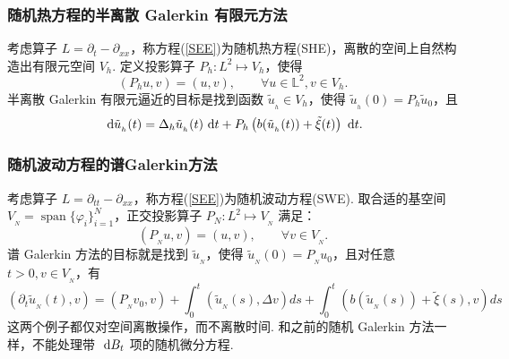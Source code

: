 \subsubsection*{随机热方程的半离散 Galerkin 有限元方法}

考虑算子 $L=\partial_t - \partial_{xx}$，称方程(\ref{SEE})为随机热方程(SHE)，离散的空间上自然构造出有限元空间 $V_h$. 定义投影算子 $P_h:L^2\mapsto V_h$，使得
\[
(P_h u,v) = (u,v),\qquad \forall u\in \mathbb L^2,v\in V_h.
\]
半离散 Galerkin 有限元逼近的目标是找到函数 $\tilde{u}_{_h} \in V_h$，使得 $\tilde u_{_h}(0) = P_h \tilde u_0$，且
\[
\text{ d} \tilde u_{_h}(t) = \Delta_h \tilde u_{_h}(t) \text{ d} t + 
P_h \left( b(\tilde u_{_h}(t))  + \tilde \xi (t)\right) \text{ d} t.
\]


\subsubsection*{随机波动方程的谱Galerkin方法}

考虑算子 $L=\partial_{tt} - \partial_{xx}$，称方程(\ref{SEE})为随机波动方程(SWE). 取合适的基空间 $V_{_N} = \operatorname{span}\{\varphi_i\}_{i=1}^N$，正交投影算子 $P_N:L^2\mapsto V_{_N}$ 满足：
\[
(P_{_N} u,v) = (u,v) ,\qquad \forall v \in V_{_N}. 
\]
谱 Galerkin 方法的目标就是找到 $\tilde{u}_{_N}$，使得 $\tilde{u}_{_N}(0) = P_{_N} u_0$，且对任意 $t>0,v\in V_{_N}$，有
\[
\left(\partial_{t} \tilde{u}_{_N}(t), v\right)=\left(P_{_N} v_{0}, v\right)+\int_{0}^{t}\left(\tilde{u}_{_N}(s), \Delta v\right) d s+\int_{0}^{t}\left(b\left(\tilde{u}_{_N}(s)\right)+\tilde{\xi}(s), v\right) d s
\]
这两个例子都仅对空间离散操作，而不离散时间. 和之前的随机 Galerkin 方法一样，不能处理带 $\text{ d} B_t$ 项的随机微分方程. 















 
 